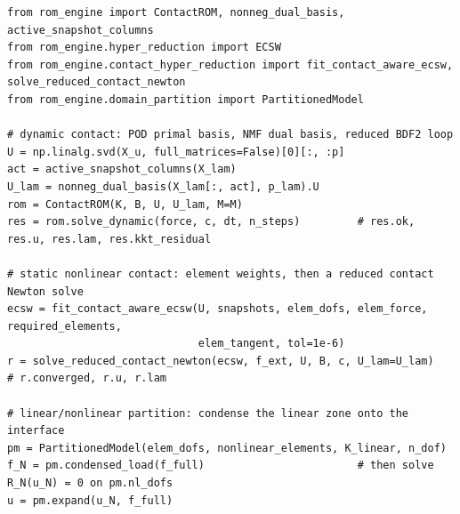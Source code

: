 \begin{lstlisting}[caption={A reduced contact model in dynamics, a contact-aware ECSW with a reduced contact Newton solve, and a partition (names as in the benchmarks of this chapter).},label={lst:hy-run}]
from rom_engine import ContactROM, nonneg_dual_basis, active_snapshot_columns
from rom_engine.hyper_reduction import ECSW
from rom_engine.contact_hyper_reduction import fit_contact_aware_ecsw, solve_reduced_contact_newton
from rom_engine.domain_partition import PartitionedModel

# dynamic contact: POD primal basis, NMF dual basis, reduced BDF2 loop
U = np.linalg.svd(X_u, full_matrices=False)[0][:, :p]
act = active_snapshot_columns(X_lam)
U_lam = nonneg_dual_basis(X_lam[:, act], p_lam).U
rom = ContactROM(K, B, U, U_lam, M=M)
res = rom.solve_dynamic(force, c, dt, n_steps)         # res.ok, res.u, res.lam, res.kkt_residual

# static nonlinear contact: element weights, then a reduced contact Newton solve
ecsw = fit_contact_aware_ecsw(U, snapshots, elem_dofs, elem_force, required_elements,
                              elem_tangent, tol=1e-6)
r = solve_reduced_contact_newton(ecsw, f_ext, U, B, c, U_lam=U_lam)   # r.converged, r.u, r.lam

# linear/nonlinear partition: condense the linear zone onto the interface
pm = PartitionedModel(elem_dofs, nonlinear_elements, K_linear, n_dof)
f_N = pm.condensed_load(f_full)                        # then solve R_N(u_N) = 0 on pm.nl_dofs
u = pm.expand(u_N, f_full)
\end{lstlisting}

